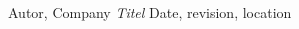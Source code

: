 %
% 

\begin{thebibliography}{------}

 						Autor, Company \newline
   											\emph{Titel} \newline
                                            Date, revision, location
\end{thebibliography}


%
%
